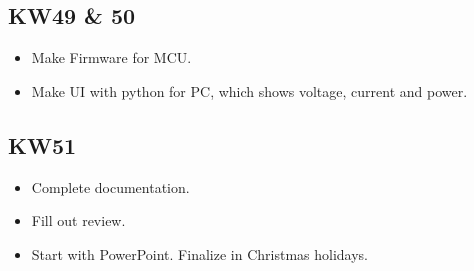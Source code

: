 \subsection{KW49 \& 50}
\begin{itemize}
  \item Make Firmware for MCU.
  \item Make UI with python for PC, which shows voltage, current and power.
\end{itemize}

\subsection{KW51}
\begin{itemize}
  \item Complete documentation.
  \item Fill out review.
  \item Start with PowerPoint. Finalize in Christmas holidays.
\end{itemize}

\newpage



